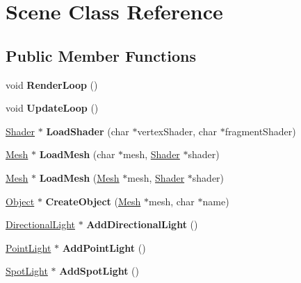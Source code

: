 \hypertarget{class_scene}{}\section{Scene Class Reference}
\label{class_scene}
\subsection*{Public Member Functions}
\begin{DoxyCompactItemize}
\item 
\hypertarget{class_scene_a71708279f69885e838e288c6689ddd1c}{}void {\bfseries Render\+Loop} ()\label{class_scene_a71708279f69885e838e288c6689ddd1c}

\item 
\hypertarget{class_scene_ab0293e9c900f18ce4ca26621d4b7ddfe}{}void {\bfseries Update\+Loop} ()\label{class_scene_ab0293e9c900f18ce4ca26621d4b7ddfe}

\item 
\hypertarget{class_scene_a6f0f7af3d07acbee2d6864c3ded98351}{}\hyperlink{class_shader}{Shader} $\ast$ {\bfseries Load\+Shader} (char $\ast$vertex\+Shader, char $\ast$fragment\+Shader)\label{class_scene_a6f0f7af3d07acbee2d6864c3ded98351}

\item 
\hypertarget{class_scene_a660e1d1c0aebaff994ea6d36d1e9fec5}{}\hyperlink{class_mesh}{Mesh} $\ast$ {\bfseries Load\+Mesh} (char $\ast$mesh, \hyperlink{class_shader}{Shader} $\ast$shader)\label{class_scene_a660e1d1c0aebaff994ea6d36d1e9fec5}

\item 
\hypertarget{class_scene_a676cf764adad1d7e30311582ccae2b7e}{}\hyperlink{class_mesh}{Mesh} $\ast$ {\bfseries Load\+Mesh} (\hyperlink{class_mesh}{Mesh} $\ast$mesh, \hyperlink{class_shader}{Shader} $\ast$shader)\label{class_scene_a676cf764adad1d7e30311582ccae2b7e}

\item 
\hypertarget{class_scene_adfdea29bf0ed9107c28f99fb8ebe34d1}{}\hyperlink{class_object}{Object} $\ast$ {\bfseries Create\+Object} (\hyperlink{class_mesh}{Mesh} $\ast$mesh, char $\ast$name)\label{class_scene_adfdea29bf0ed9107c28f99fb8ebe34d1}

\item 
\hypertarget{class_scene_a8ba56754e230d7a99736c5232bd912ea}{}\hyperlink{class_directional_light}{Directional\+Light} $\ast$ {\bfseries Add\+Directional\+Light} ()\label{class_scene_a8ba56754e230d7a99736c5232bd912ea}

\item 
\hypertarget{class_scene_ac33b9cc536096a447892f524802dd2ec}{}\hyperlink{class_point_light}{Point\+Light} $\ast$ {\bfseries Add\+Point\+Light} ()\label{class_scene_ac33b9cc536096a447892f524802dd2ec}

\item 
\hypertarget{class_scene_a5086a9e37b94c2dfb30dfacbee668c79}{}\hyperlink{class_spot_light}{Spot\+Light} $\ast$ {\bfseries Add\+Spot\+Light} ()\label{class_scene_a5086a9e37b94c2dfb30dfacbee668c79}

\end{DoxyCompactItemize}
